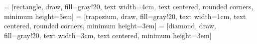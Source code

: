 
\usepackage[dvipsnames]{xcolor}

\usepackage{textcomp}

\usepackage{tikz}
\usetikzlibrary{shapes, shapes.misc, arrows, fit, positioning}
 = [rectangle, draw, fill=gray!20, text width=4cm, text centered, rounded corners, minimum height=3em]
 = [trapezium, draw, fill=gray!20, text width=1cm, text centered, rounded corners, minimum height=3em]
 = [diamond, draw, fill=gray!20, text width=3cm, text centered, minimum height=3em]

\usepackage{float}
\usepackage{booktabs}
\usepackage{pbox}
\usepackage{multirow}
\usepackage[normalem]{ulem}
\useunder{\uline}{\ul}{}

\usepackage{hyperref}

\def\UrlBreaks{\do\/\do-\do\ }

\renewcommand{\UrlFont}{\small\ttfamily\itshape}

\usepackage{csquotes}
\usepackage{framed}
\usepackage{enumitem}

\usepackage{listings}

%   
%

